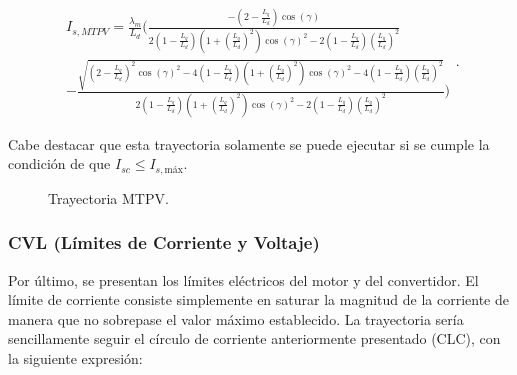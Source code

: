\begin{equation}
\begin{split}
I_{s,MTPV} = \frac{\lambda_m}{L_d} ( \frac{-(2 - \frac{L_q}{L_d}) \cos(\gamma)}{2(1 - \frac{L_q}{L_d})(1 + (\frac{L_q}{L_d})^2) \cos(\gamma)^2 - 2(1 - \frac{L_q}{L_d}) (\frac{L_q}{L_d})^2}\\
-\frac{\sqrt{(2 - \frac{L_q}{L_d})^2 \cos(\gamma)^2 - 4(1 - \frac{L_q}{L_d})(1 + (\frac{L_q}{L_d})^2) \cos(\gamma)^2 - 4(1 - \frac{L_q}{L_d}) (\frac{L_q}{L_d})^2}}{2(1 - \frac{L_q}{L_d})(1 + (\frac{L_q}{L_d})^2) \cos(\gamma)^2 - 2(1 - \frac{L_q}{L_d}) (\frac{L_q}{L_d})^2} )
\end{split} \text{.}
\end{equation}




Cabe destacar que esta trayectoria solamente se puede ejecutar si se cumple la condición de que $I_{sc} \leq I_{s,\text{máx}}$.


\begin{figure}[H]
  \centering
  \caption{Trayectoria MTPV.}
\end{figure}



\subsubsection{CVL (Límites de Corriente y Voltaje)}

Por último, se presentan los límites eléctricos del motor y del convertidor. El límite de corriente consiste simplemente en saturar la magnitud de la corriente de manera que no sobrepase el valor máximo establecido. La trayectoria sería sencillamente seguir el círculo de corriente anteriormente presentado (CLC), con la siguiente expresión:

